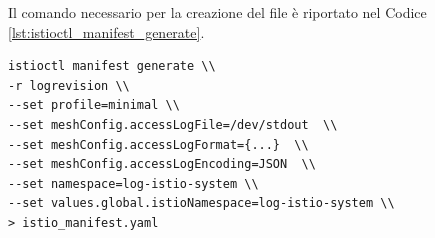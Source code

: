 Il comando necessario per la creazione del file è riportato nel Codice \ref{lst:istioctl_manifest_generate}.
\begin{lstlisting}[caption={Comando per la creazione del file manifest di Istio.}, label=lst:istioctl_manifest_generate]
istioctl manifest generate \\
-r logrevision \\
--set profile=minimal \\
--set meshConfig.accessLogFile=/dev/stdout  \\
--set meshConfig.accessLogFormat={...}  \\
--set meshConfig.accessLogEncoding=JSON  \\
--set namespace=log-istio-system \\
--set values.global.istioNamespace=log-istio-system \\
> istio_manifest.yaml
\end{lstlisting}

